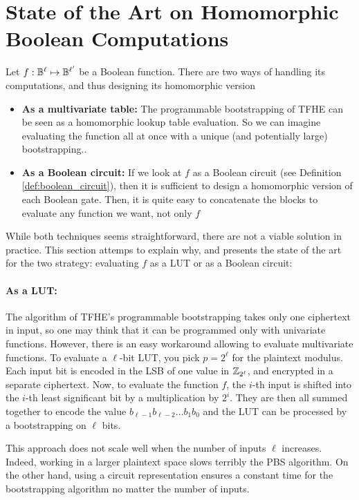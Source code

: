 \section{State of the Art on Homomorphic Boolean Computations}


Let $f : \mathbb{B}^\ell \mapsto \mathbb{B}^{\ell'}$ be a Boolean function. There are two ways of handling its computations, and thus designing its homomorphic version

\begin{itemize}
	\item \textbf{As a multivariate table: } The programmable bootstrapping of \gls{TFHE} can be seen as a homomorphic lookup table evaluation. So we can imagine evaluating the function all at once with a unique (and potentially large) bootstrapping..
	\item \textbf{As a Boolean circuit: } If we look at $f$ as a Boolean circuit (see Definition \ref{def:boolean_circuit}), then it is sufficient to design a homomorphic version of each Boolean gate. Then, it is quite easy to concatenate the blocks to evaluate any function we want, not only $f$
\end{itemize}


While both techniques seems straightforward, there are not a viable solution in practice. This section attemps to explain why, and presents the state of the art for the two strategy: evaluating $f$ as a \gls{LUT} or as a Boolean circuit:


\paragraph{As a \gls{LUT}:}


The algorithm of \gls{TFHE}'s programmable bootstrapping takes only one ciphertext in input, so one may think that it can be programmed only with univariate functions. However, there is an easy workaround allowing to evaluate multivariate functions.
To evaluate a $\ell$-bit \gls{LUT}, you pick $p = 2^\ell$ for the plaintext modulus. Each input bit is encoded in the \gls{LSB} of one value in $\mathbb{Z}_{2^\ell}$, and encrypted in a separate ciphertext. Now, to evaluate the function $f$, the $i$-th input is shifted into the $i$-th least significant bit by a multiplication by $2^i$. They are then all summed together to encode the value $b_{\ell-1}b_{\ell-2}\dots b_1b_0$ and the \gls{LUT} can be processed by a bootstrapping on $\ell$ bits.

This approach does not scale well when the number of inputs $\ell$ increases. Indeed, working in a larger plaintext space slows terribly the \gls{PBS} algorithm. On the other hand, using a circuit representation ensures a constant time for the bootstrapping algorithm no matter the number of inputs. 



